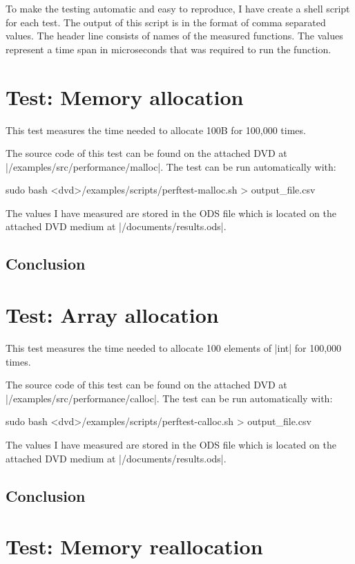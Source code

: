 To make the testing automatic and easy to reproduce, I have create a shell
script for each test. The output of this script is in the format of comma
separated values. The header line consists of names of the measured functions.
The values represent a time span in microseconds that was required to run the
function.

\section{Test: Memory allocation}

This test measures the time needed to allocate 100B for 100,000 times.

\funclistend
The source code of this test can be found on the attached DVD at
|/examples/src/performance/malloc|. The test can be run automatically with:
\begin{commandline}
sudo bash <dvd>/examples/scripts/perftest-malloc.sh > output_file.csv
\end{commandline}
\funclistend
The values I have measured are stored in the ODS file which is located on the
attached DVD medium at |/documents/results.ods|.

\subsection{Conclusion}

\section{Test: Array allocation}

This test measures the time needed to allocate 100 elements of |int| for 100,000
times.

\funclistend
The source code of this test can be found on the attached DVD at
|/examples/src/performance/calloc|. The test can be run automatically with:
\begin{commandline}
sudo bash <dvd>/examples/scripts/perftest-calloc.sh > output_file.csv
\end{commandline}
\funclistend
The values I have measured are stored in the ODS file which is located on the
attached DVD medium at |/documents/results.ods|.

\subsection{Conclusion}

\section{Test: Memory reallocation}

